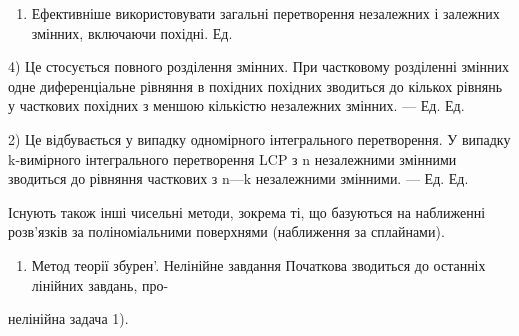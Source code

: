 \documentclass[
  ukrainian,
]{article}
\providecommand{\tightlist}{%
  \setlength{\itemsep}{0pt}\setlength{\parskip}{0pt}}
\begin{document}
\begin{enumerate}
\def\labelenumi{\alph{enumi})}
\setcounter{enumi}{4}
\tightlist
\item
  Ефективніше використовувати загальні перетворення незалежних і
  залежних змінних, включаючи похідні. Ед.
\end{enumerate}

4) Це стосується повного розділення змінних. При частковому розділенні
змінних одне диференціальне рівняння в похідних похідних зводиться до
кількох рівнянь у часткових похідних з меншою кількістю незалежних
змінних. --- Ед. Ед.

2) Це відбувається у випадку одномірного інтегрального перетворення. У
випадку k-вимірного інтегрального перетворення LCP з n незалежними
змінними зводиться до рівняння часткових з n---k незалежними змінними.
--- Ед. Ед.

Існують також інші чисельні методи, зокрема ті, що базуються на
наближенні розв'язків за поліноміальними поверхнями (наближення за
сплайнами).

\begin{enumerate}
\def\labelenumi{\arabic{enumi}.}
\setcounter{enumi}{5}
\tightlist
\item
  Метод теорії збурен'. Нелінійне завдання Початкова зводиться до
  останніх лінійних завдань, про-
\end{enumerate}

нелінійна задача 1).
\end{document}

